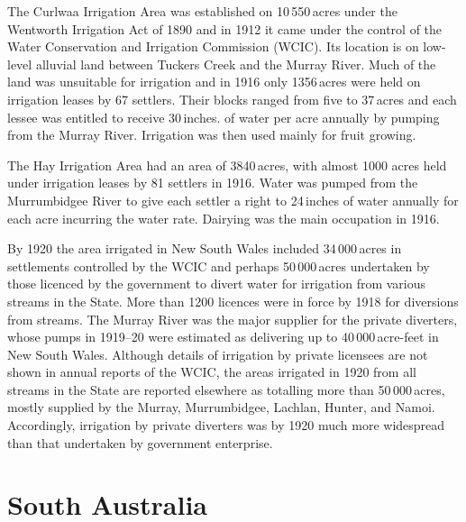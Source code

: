 The Curlwaa Irrigation Area  was
established on 10\,550\,acres under the Wentworth Irrigation Act of
1890 and in 1912 it came under the control of the Water Conservation
and Irrigation Commission (WCIC).  Its location is on
low-level alluvial land between Tuckers Creek 
and the Murray River. Much of the land was unsuitable for irrigation
and in 1916 only 1356\,acres were held on irrigation leases by 67
settlers.  Their blocks ranged from five to 37\,acres and each lessee
was entitled to receive 30\,inches. of water per acre annually by
pumping from the Murray River.  Irrigation was then used mainly for
fruit growing.

The Hay Irrigation Area  had an area of
3840\,acres, with almost 1000 acres held under irrigation leases by 81
settlers in 1916. Water was pumped from the Murrumbidgee River to give
each settler a right to 24\,inches of water annually for each acre
incurring the water rate.  Dairying was the main occupation in
1916.

By 1920 the area irrigated in New South Wales included 34\,000\,acres
in settlements controlled by the WCIC and perhaps 50\,000\,acres
undertaken by those licenced by the government to divert water for
irrigation from various streams in the State.  More than 1200 licences
were in force by 1918 for diversions from streams.  The Murray River
was the major supplier for the private diverters, whose pumps in
1919--20 were estimated as delivering up to 40\,000\,acre-feet in New
South Wales.  Although details of irrigation by private licensees are
not shown in annual reports of the WCIC, the areas irrigated in 1920
from all streams in the State are reported elsewhere as totalling more
than 50\,000\,acres, mostly supplied by the Murray, Murrumbidgee,
Lachlan, Hunter, and Namoi.  Accordingly, irrigation by private
diverters was by 1920 much more widespread than that undertaken by
government enterprise.

\section*{South Australia}

